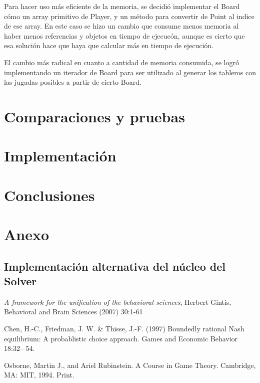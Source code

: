 \documentclass[10pt,a4paper,notitlepage,draft]{article}
\begin{document}
    Para hacer uso más eficiente de la memoria, se decidió implementar el Board cómo un array primitivo de Player, y un método para convertir de Point al indice de ese array.
    En este caso se hizo un cambio que consume menos memoria al haber menos referencias y objetos en tiempo de ejecucón, aunque es cierto que esa solución hace que haya que calcular más en tiempo de ejecución.

    El cambio más radical en cuanto a cantidad de memoria consumida, se logró implementando un iterador de Board para ser utilizado al generar los tableros con
    las jugadas posibles a partir de cierto Board.

\section{Comparaciones y pruebas}
\section{Implementación}
\section{Conclusiones}
\section{Anexo}
\subsection{Implementación alternativa del núcleo del Solver}
\begin{thebibliography}{9}
   \emph{A framework for the unification of the behavioral sciences}, Herbert Gintis, Behavioral and Brain Sciences (2007) 30:1-61
  
   Chen, H.-C., Friedman, J. W. \& Thisse, J.-F. (1997) Boundedly rational Nash
equilibrium: A probablistic choice approach. Games and Economic Behavior
18:32– 54.

   Osborne, Martin J., and Ariel Rubinstein. A Course in Game Theory. Cambridge, MA: MIT, 1994. Print.

\end{thebibliography}
\end{document}
